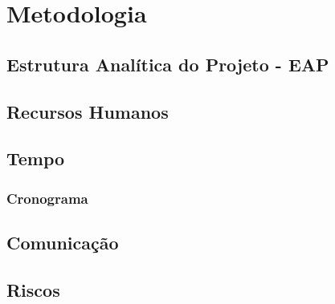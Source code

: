 \chapter[Metodologia]{Metodologia}

	\section[Estrutura Analítica do Projeto - EAP]{Estrutura Analítica do Projeto - EAP}

	\section[Recursos Humanos]{Recursos Humanos}
	
	\section[Tempo]{Tempo}
		\subsection[Cronograma]{Cronograma}

	\section[Comunicação]{Comunicação}
	
	\section[Riscos]{Riscos}
